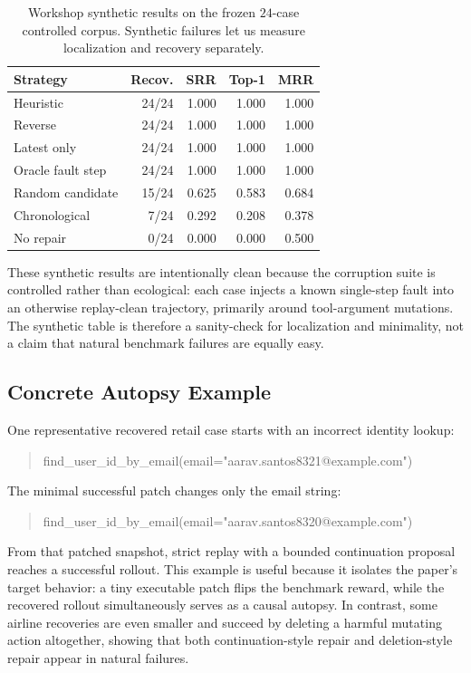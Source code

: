 \documentclass{article}
\begin{document}
\begin{table}[t]
\centering
\small
\begin{tabular}{lrrrr}
\toprule
Strategy & Recov. & SRR & Top-1 & MRR \\
\midrule
Heuristic & 24/24 & 1.000 & 1.000 & 1.000 \\
Reverse & 24/24 & 1.000 & 1.000 & 1.000 \\
Latest only & 24/24 & 1.000 & 1.000 & 1.000 \\
Oracle fault step & 24/24 & 1.000 & 1.000 & 1.000 \\
Random candidate & 15/24 & 0.625 & 0.583 & 0.684 \\
Chronological & 7/24 & 0.292 & 0.208 & 0.378 \\
No repair & 0/24 & 0.000 & 0.000 & 0.500 \\
\bottomrule
\end{tabular}
\caption{Workshop synthetic results on the frozen $24$-case controlled corpus.
Synthetic failures let us measure localization and recovery separately.}
\label{tab:workshop_synthetic_results}
\end{table}

These synthetic results are intentionally clean because the corruption suite is
controlled rather than ecological: each case injects a known single-step fault
into an otherwise replay-clean trajectory, primarily around tool-argument
mutations. The synthetic table is therefore a sanity-check for localization and
minimality, not a claim that natural benchmark failures are equally easy.

\subsection*{Concrete Autopsy Example}

One representative recovered retail case starts with an incorrect identity
lookup:
\begin{quote}
\small\ttfamily
find\_user\_id\_by\_email(email="aarav.santos8321@example.com")
\end{quote}
The minimal successful patch changes only the email string:
\begin{quote}
\small\ttfamily
find\_user\_id\_by\_email(email="aarav.santos8320@example.com")
\end{quote}
From that patched snapshot, strict replay with a bounded continuation proposal
reaches a successful rollout. This example is useful because it isolates the
paper's target behavior: a tiny executable patch flips the benchmark reward,
while the recovered rollout simultaneously serves as a causal autopsy. In
contrast, some airline recoveries are even smaller and succeed by deleting a
harmful mutating action altogether, showing that both continuation-style repair
and deletion-style repair appear in natural failures.
\end{document}

